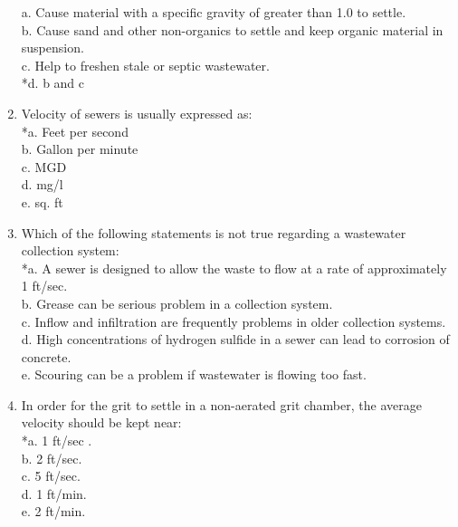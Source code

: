 \begin{enumerate}
a. Cause material with a specific gravity of greater than 1.0 to settle. \\
b. Cause sand and other non-organics to settle and keep organic material in suspension. \\
c. Help to freshen stale or septic wastewater. \\
*d. b and c 

\vspace{0.4cm}
\item  Velocity of sewers is usually expressed as: \\

*a. Feet per second \\
b. Gallon per minute \\
c. MGD \\
d. mg/l \\
e. sq. ft 

\vspace{0.4cm}
\item  Which of the following statements is not true regarding a wastewater collection system: \\

*a. A sewer is designed to allow the waste to flow at a rate of approximately 1 ft/sec. \\
b. Grease can be serious problem in a collection system. \\
c. Inflow and infiltration are frequently problems in older collection systems. \\
d. High concentrations of hydrogen sulfide in a sewer can lead to corrosion of concrete. \\
e. Scouring can be a problem if wastewater is flowing too fast. 

\vspace{0.4cm}
\item In order for the grit to settle in a non-aerated grit chamber, the average velocity should be kept near:\\

*a. 1 ft/sec . \\
b. 2 ft/sec. \\
c. 5 ft/sec. \\
d. 1 ft/min. \\
e. 2 ft/min. 

\end{enumerate}